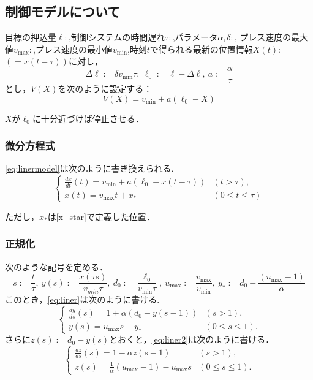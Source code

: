 \documentclass [dvipdfmx] {jsarticle}
\numberwithin{equation}{section}
\theoremstyle{definition} %
\theoremstyle{definition} %
\begin{document}
\subsection{制御モデルについて}
目標の押込量$\ell:$,制御システムの時間遅れ$\tau:$,パラメータ$\alpha,\delta:$,
プレス速度の最大値$v_{\max}:$,プレス速度の最小値$v_{\min}$,時刻$t$で得られる最新の位置情報$X(t):$
$(=x(t-\tau))$に対し，
\begin{equation}
    \Delta\ell :=\delta v_{\min}\tau,\ \ell_0:=\ell-\Delta\ell,\ a:=\frac{\alpha}{\tau}
\end{equation}
とし，$V(X)$を次のように設定する：
\begin{equation}\label{eq:linermodel}
    V(X)=v_{\min}+a(\ell_0-X)
\end{equation}

$X$が$\ell_0$に十分近づけば停止させる．


\subsubsection{微分方程式}
\eqref{eq:linermodel}は次のように書き換えられる.
\begin{equation}\label{eq:liner}\begin{cases}
    \displaystyle\frac{dx}{dt}(t)=v_{\min}+a(\ell_0-x(t-\tau)) &(t>\tau),\\
    x(t)=v_{\max}t+x_\ast &(0\le t \le \tau)
\end{cases}\end{equation}

ただし，$x_\ast$は\eqref{x_star}で定義した位置．

\subsubsection{正規化}
次のような記号を定める．
\begin{equation}
    s:=\displaystyle\frac{t}{\tau},\ y(s):=\displaystyle\frac{x(\tau s)}{v_{min}\tau},\
    d_0:=\frac{\ell_0}{v_{\min}\tau},\ u_{\max}:=\displaystyle\frac{v_{\max}}{v_{\min}},\ 
    y_\ast:=d_0-\displaystyle\frac{(u_{\max}-1)}{\alpha}
\end{equation}
このとき，\eqref{eq:liner}は次のように書ける.
\begin{equation}\label{eq:liner2}\begin{cases}
    \displaystyle\frac{dy}{ds}(s)=1+\alpha(d_0-y(s-1)) &(s>1),\\
    y(s)=u_{\max}s+y_\ast &(0\le s \le 1).
\end{cases}\end{equation}
さらに$z(s):=d_0-y(s)$とおくと，\eqref{eq:liner2}は次のように書ける．
\begin{equation}\label{z_press}\begin{cases}
    \displaystyle\frac{dz}{ds}(s)=1-\alpha z(s-1) &(s>1),\\
    z(s)=\displaystyle\frac{1}{\alpha}(u_{\max}-1)-u_{\max}s &(0\le s\le 1).
\end{cases}\end{equation}
\end{document}
